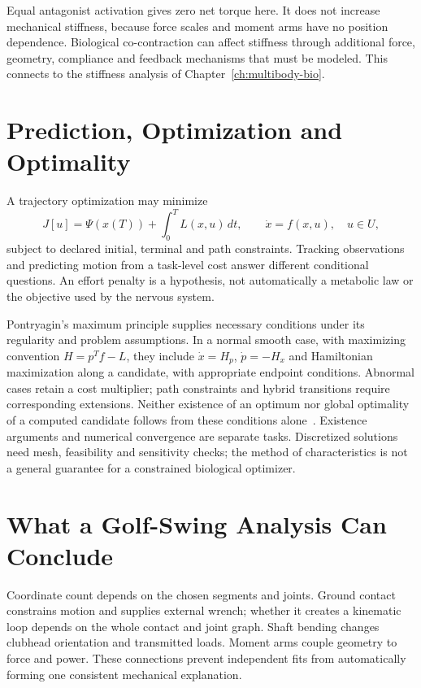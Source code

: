 Equal antagonist activation gives zero net torque here. It does not increase
mechanical stiffness, because force scales and moment arms have no position
dependence. Biological co-contraction can affect stiffness through additional
force, geometry, compliance and feedback mechanisms that must be modeled.
This connects to the stiffness analysis of Chapter~\ref{ch:multibody-bio}.

\section{Prediction, Optimization and Optimality}
A trajectory optimization may minimize
\begin{equation}
 J[u]=\Psi(x(T))+\int_0^T L(x,u)\,dt,
 \qquad \dot x=f(x,u),\quad u\in U,
\end{equation}
subject to declared initial, terminal and path constraints. Tracking observations
and predicting motion from a task-level cost answer different conditional questions.
An effort penalty is a hypothesis, not automatically a metabolic law or the
objective used by the nervous system.

Pontryagin's maximum principle supplies necessary conditions under its regularity
and problem assumptions. In a normal smooth case, with maximizing convention
$H=p^Tf-L$, they include $\dot x=H_p$, $\dot p=-H_x$ and Hamiltonian maximization
along a candidate, with appropriate endpoint conditions. Abnormal cases retain a
cost multiplier; path constraints and hybrid transitions require corresponding
extensions. Neither existence of an optimum nor global optimality of a computed
candidate follows from these conditions alone~\cite{LiberzonControlReview}.
Existence arguments and numerical convergence are separate tasks. Discretized
solutions need mesh, feasibility and sensitivity checks; the method of
characteristics is not a general guarantee for a constrained biological optimizer.

\section{What a Golf-Swing Analysis Can Conclude}
Coordinate count depends on the chosen segments and joints. Ground contact
constrains motion and supplies external wrench; whether it creates a kinematic loop
depends on the whole contact and joint graph. Shaft bending changes clubhead
orientation and transmitted loads. Moment arms couple geometry to force and power.
These connections prevent independent fits from automatically forming one
consistent mechanical explanation.

